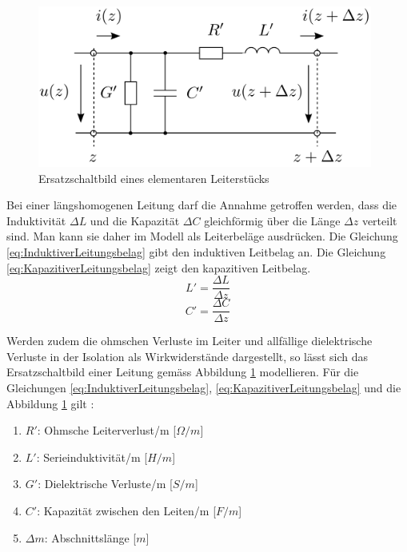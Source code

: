 \begin{figure}[!htb]
	\centering
	\includegraphics[width=11cm]{content/bilder/Leiterstueck.pdf}%
	\caption{Ersatzschaltbild eines elementaren Leiterstücks}
	\label{fig:ESBLeiterstueck}
\end{figure}

Bei einer längshomogenen Leitung darf die Annahme getroffen werden, dass die Induktivität $\Delta L$ und die Kapazität $\Delta C$ gleichförmig über die Länge $\Delta z$ verteilt sind. Man kann sie daher im Modell als Leiterbeläge ausdrücken. Die Gleichung \ref{eq:InduktiverLeitungsbelag} gibt den induktiven Leitbelag an. Die Gleichung \ref{eq:KapazitiverLeitungsbelag} zeigt den kapazitiven Leitbelag.
\begin{equation}
L'=\dfrac{\Delta L}{\Delta z}\label{eq:InduktiverLeitungsbelag}
\end{equation}
\begin{equation}
C'=\dfrac{\Delta C}{\Delta z}\label{eq:KapazitiverLeitungsbelag}
\end{equation}

Werden zudem die ohmschen Verluste im Leiter und allfällige dielektrische Verluste in der Isolation als Wirkwiderstände dargestellt, so lässt sich das Ersatzschaltbild einer Leitung gemäss Abbildung \ref{fig:ESBLeiterstueck} modellieren.
Für die Gleichungen \ref{eq:InduktiverLeitungsbelag}, \ref{eq:KapazitiverLeitungsbelag} und die Abbildung \ref{fig:ESBLeiterstueck} gilt \cite{Tekom}:
\begin{enumerate}[leftmargin=2cm]
   \item[] $R'$: Ohmsche Leiterverlust/m [$\Omega/m$] 
   \item[] $L'$: Serieinduktivität/m  [$H/m$] 
   \item[] $G'$: Dielektrische Verluste/m  [$S/m$] 
   \item[] $C'$: Kapazität zwischen den Leiten/m  [$F/m$] 
   \item[] $\Delta m$: Abschnittslänge  [$m$] 
\end{enumerate} 


